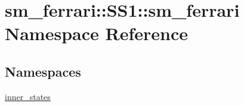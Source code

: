 \hypertarget{namespacesm__ferrari_1_1SS1_1_1sm__ferrari}{}\section{sm\+\_\+ferrari\+:\+:S\+S1\+:\+:sm\+\_\+ferrari Namespace Reference}
\label{namespacesm__ferrari_1_1SS1_1_1sm__ferrari}
\subsection*{Namespaces}
\begin{DoxyCompactItemize}
\item 
 \hyperlink{namespacesm__ferrari_1_1SS1_1_1sm__ferrari_1_1inner__states}{inner\+\_\+states}
\end{DoxyCompactItemize}
